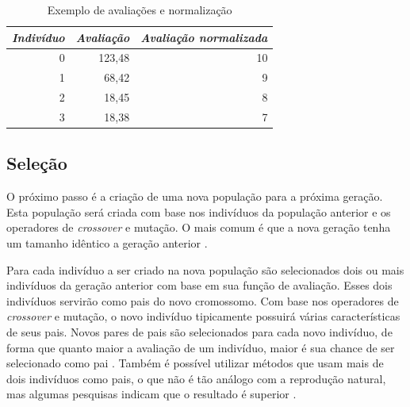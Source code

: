 \documentclass[12pt,oneside,a4paper,english,french,spanish,brazil,]{abntex2}
\begin{document}
\begin{table}[tbp]
\centering
\caption{Exemplo de avaliações e normalização}
\label{tab:Normalizacao_Avaliacao}
\begin{tabular}{rrr}
\hline
\multicolumn{1}{l}{\textit{\textbf{Indivíduo}}} & \multicolumn{1}{l}{\textit{\textbf{Avaliação}}} & \multicolumn{1}{l}{\textit{\textbf{Avaliação normalizada}}} \\ \hline
0                                                & 123,48                                           & 10                                                           \\
1                                                & 68,42                                            & 9                                                            \\
2                                                & 18,45                                            & 8                                                            \\
3                                                & 18,38                                            & 7    \\ \hline                                                       
\end{tabular}
\end{table}

\subsection{Seleção}

O próximo passo é a criação de uma nova população para a próxima geração. Esta população será criada com base nos indivíduos da população anterior e os operadores de \textit{crossover} e mutação. O mais comum é que a nova geração tenha um tamanho idêntico a geração anterior \cite{linden:2008}.

Para cada indivíduo a ser criado na nova população são selecionados dois ou mais indivíduos da geração anterior com base em sua função de avaliação. Esses dois indivíduos servirão como pais do novo cromossomo. Com base nos operadores de \textit{crossover} e mutação, o novo indivíduo tipicamente possuirá várias características de seus pais. Novos pares de pais são selecionados para cada novo indivíduo, de forma que quanto maior a avaliação de um indivíduo, maior é sua chance de ser selecionado como pai \cite{linden:2008}. Também é possível utilizar métodos que usam mais de dois indivíduos como pais, o que não é tão análogo com a reprodução natural, mas algumas pesquisas indicam que o resultado é superior \cite{ting:2005} \cite{eiben:1994}.
\end{document}
